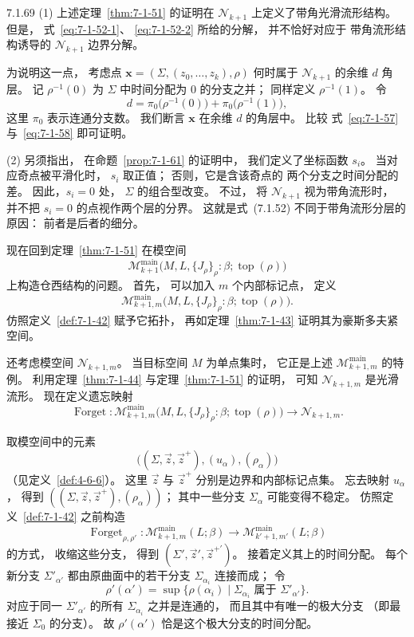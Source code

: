\begin{remark}{7.1.69}\label{rem:7-1-69}
\textup{(1)}
上述定理~\ref{thm:7-1-51}
的证明在
$\mathcal N_{k+1}$
上定义了带角光滑流形结构。
但是，
式~\eqref{eq:7-1-52-1}、
\eqref{eq:7-1-52-2}
所给的分解，
并不恰好对应于
带角流形结构诱导的
$\mathcal N_{k+1}$ 边界分解。

为说明这一点，
考虑点
$\mathbf x
=(\Sigma,(z_0,\ldots,z_k),\rho)$
何时属于
$\mathcal N_{k+1}$
的余维 $d$ 角层。
记 $\rho^{-1}(0)$
为 $\Sigma$ 中时间分配为 $0$
的分支之并；
同样定义
$\rho^{-1}(1)$。
令
\[
d=
\pi_0\bigl(\rho^{-1}(0)\bigr)
+\pi_0\bigl(\rho^{-1}(1)\bigr),
\]
这里 $\pi_0$ 表示连通分支数。
我们断言 $\mathbf x$
在余维 $d$ 的角层中。
比较
式~\eqref{eq:7-1-57}
与~\eqref{eq:7-1-58}
即可证明。

\textup{(2)}
另须指出，
在命题~\ref{prop:7-1-61}
的证明中，
我们定义了坐标函数 $s_i$。
当对应奇点被平滑化时，
$s_i$ 取正值；
否则，它是含该奇点的
两个分支之时间分配的差。
因此，$s_i=0$ 处，
$\Sigma$ 的组合型改变。
不过，
将 $\mathcal N_{k+1}$
视为带角流形时，
并不把 $s_i=0$
的点视作两个层的分界。
这就是式~(7.1.52)
不同于带角流形分层的原因：
前者是后者的细分。
\end{remark}

现在回到定理~\ref{thm:7-1-51}
在模空间
\[
\mathcal M^{\mathrm{main}}_{k+1}
\bigl(
M,L,\{J_\rho\}_\rho:\beta;\operatorname{top}(\rho)
\bigr)
\]
上构造仓西结构的问题。
首先，
可以加入 $m$ 个内部标记点，
定义
\[
\mathcal M^{\mathrm{main}}_{k+1,m}
\bigl(
M,L,\{J_\rho\}_\rho:\beta;\operatorname{top}(\rho)
\bigr).
\]
仿照定义~\ref{def:7-1-42}
赋予它拓扑，
再如定理~\ref{thm:7-1-43}
证明其为豪斯多夫紧空间。

还考虑模空间
$\mathcal N_{k+1,m}$。
当目标空间 $M$ 为单点集时，
它正是上述
$\mathcal M^{\mathrm{main}}_{k+1,m}$
的特例。
利用定理~\ref{thm:7-1-44}
与定理~\ref{thm:7-1-51}
的证明，
可知
$\mathcal N_{k+1,m}$
是光滑流形。
现在定义遗忘映射
\[
\operatorname{Forget}\colon
\mathcal M^{\mathrm{main}}_{k+1,m}
\bigl(
M,L,\{J_\rho\}_\rho:\beta;\operatorname{top}(\rho)
\bigr)
\longrightarrow
\mathcal N_{k+1,m}.
\]

取模空间中的元素
\[
\bigl(
(\Sigma,\vec z,\vec z^{+}),
(u_\alpha),(\rho_\alpha)
\bigr)
\]
（见定义~\ref{def:4-6-6}）。
这里
$\vec z$ 与 $\vec z^+$
分别是边界和内部标记点集。
忘去映射 $u_\alpha$，
得到
$((\Sigma,\vec z,\vec z^+),(\rho_\alpha))$；
其中一些分支
$\Sigma_\alpha$
可能变得不稳定。
仿照定义~\ref{def:7-1-42}
之前构造
\[
\operatorname{Forget}_{\rho,\rho'}\colon
\mathcal M^{\mathrm{main}}_{k+1,m}(L;\beta)
\longrightarrow
\mathcal M^{\mathrm{main}}_{k'+1,m'}(L;\beta)
\]
的方式，
收缩这些分支，
得到
$(\Sigma',\vec z',\vec z^{+\prime})$。
接着定义其上的时间分配。
每个新分支
$\Sigma'_{\alpha'}$
都由原曲面中的若干分支
$\Sigma_{\alpha_i}$
连接而成；
令
\[
\rho'(\alpha')
=
\sup\{
\rho(\alpha_i)
\mid
\Sigma_{\alpha_i}
\text{ 属于 }\Sigma'_{\alpha'}
\}.
\]
对应于同一
$\Sigma'_{\alpha'}$
的所有
$\Sigma_{\alpha_i}$
之并是连通的，
而且其中有唯一的极大分支
（即最接近 $\Sigma_0$ 的分支）。
故 $\rho'(\alpha')$
恰是这个极大分支的时间分配。

